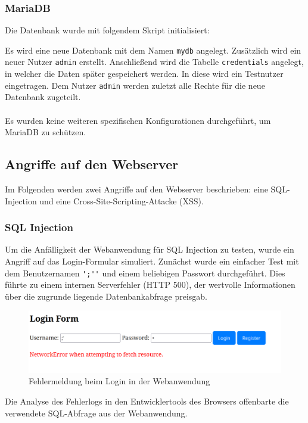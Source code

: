 \documentclass[
    a4paper,
    pagesize,
	pdftex,
    12pt,
]{scrartcl}
\begin{document}
\subsubsection{MariaDB}
Die Datenbank wurde mit folgendem Skript initialisiert:

Es wird eine neue Datenbank mit dem Namen \lstinline[breaklines]|mydb| angelegt. Zusätzlich wird ein neuer Nutzer \lstinline[breaklines]|admin| erstellt. Anschließend wird die Tabelle \lstinline[breaklines]|credentials| angelegt, in welcher die Daten später gespeichert werden. In diese wird ein Testnutzer eingetragen. Dem Nutzer \lstinline[breaklines]|admin| werden zuletzt alle Rechte für die neue Datenbank zugeteilt. \\ \\
Es wurden keine weiteren spezifischen Konfigurationen durchgeführt, um MariaDB zu schützen.

\subsection{Angriffe auf den Webserver}
Im Folgenden werden zwei Angriffe auf den Webserver beschrieben: eine SQL-Injection und eine Cross-Site-Scripting-Attacke (XSS).

\subsubsection{SQL Injection}
Um die Anfälligkeit der Webanwendung für SQL Injection zu testen, wurde ein Angriff auf das Login-Formular simuliert. Zunächst wurde ein einfacher Test mit dem Benutzernamen \lstinline[breaklines]|';''| und einem beliebigen Passwort durchgeführt. Dies führte zu einem internen Serverfehler (HTTP 500), der wertvolle Informationen über die zugrunde liegende Datenbankabfrage preisgab.

\begin{figure}[H]
	\centering
	\includegraphics[width=15cm]{sql-login-error-message.png}
	\caption{Fehlermeldung beim Login in der Webanwendung}
	\label{fig:sql-login-error-message}
\end{figure}

\noindent Die Analyse des Fehlerlogs in den Entwicklertools des Browsers offenbarte die verwendete SQL-Abfrage aus der Webanwendung.
\end{document}
